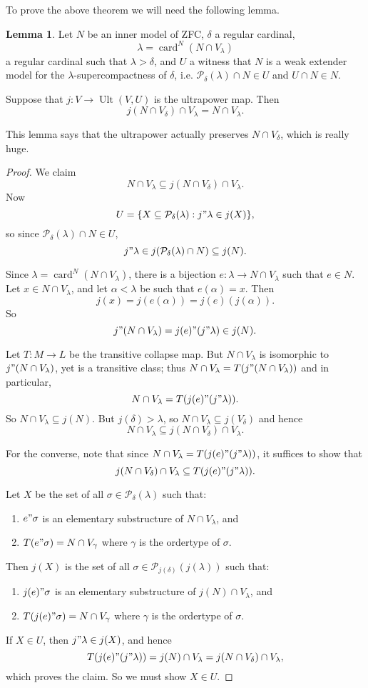 \documentclass[12pt]{report}
\newcommand{\card}{\operatorname{card}}
\newcommand{\pset}{\mathcal{P}}
\DeclareMathOperator{\Ult}{Ult}
\theoremstyle{definition}
\newtheorem{lemma}[theorem]{Lemma}
\begin{document}
To prove the above theorem we will need the following lemma.
\begin{lemma}
Let $N$ be an inner model of ZFC, $\delta$ a regular cardinal,
$$\lambda = \card^N(N \cap V_\lambda)$$
a regular cardinal such that $\lambda > \delta$, and $U$ a witness that $N$ is a weak extender model for the $\lambda$-supercompactness of $\delta$, i.e. $\pset_\delta(\lambda) \cap N \in U$ and $U \cap N \in N$.

Suppose that $j: V \to \Ult(V, U)$ is the ultrapower map. Then
$$j(N \cap V_\delta) \cap V_\lambda = N \cap V_\lambda.$$
\end{lemma}
This lemma says that the ultrapower actually preserves $N \cap V_\delta$, which is really huge.
\begin{proof}
We claim
$$N \cap V_\lambda \subseteq j(N \cap V_\delta) \cap V_\lambda.$$
Now
$$U = \{X \subseteq \pset_\delta(\lambda): j"\lambda \in j(X)\},$$
so since $\pset_\delta(\lambda) \cap N \in U$,
$$j"\lambda \in j(\pset_\delta(\lambda) \cap N) \subseteq j(N).$$

Since $\lambda = \card^N(N \cap V_\lambda)$, there is a bijection $e: \lambda \to N \cap V_\lambda$ such that $e \in N$.
Let $x \in N \cap V_\lambda$, and let $\alpha < \lambda$ be such that $e(\alpha) = x$. Then
$$j(x) = j(e(\alpha)) = j(e)(j(\alpha)).$$
So
$$j"(N \cap V_\lambda) = j(e)"(j"\lambda) \in j(N).$$

Let $T: M \to L$ be the transitive collapse map.
But $N \cap V_\lambda$ is isomorphic to $j"(N \cap V_\lambda)$, yet is a transitive class; thus $N \cap V_\lambda = T(j"(N \cap V_\lambda))$ and in particular,
$$N \cap V_\lambda = T(j(e)"(j"\lambda)).$$
So $N \cap V_\lambda \subseteq j(N)$.
But $j(\delta) > \lambda$, so $N \cap V_\lambda \subseteq j(V_\delta)$ and hence
$$N \cap V_\lambda \subseteq j(N \cap V_\delta) \cap V_\lambda.$$

For the converse, note that since $N \cap V_\lambda = T(j(e)"(j"\lambda))$, it suffices to show that
$$j(N \cap V_\delta) \cap V_\lambda \subseteq T(j(e)"(j"\lambda)).$$

Let $X$ be the set of all $\sigma \in \pset_\delta(\lambda)$ such that:
\begin{enumerate}
\item $e"\sigma$ is an elementary substructure of $N \cap V_\lambda$, and
\item $T(e"\sigma) = N \cap V_\gamma$ where $\gamma$ is the ordertype of $\sigma$.
\end{enumerate}
Then $j(X)$ is the set of all $\sigma \in \pset_{j(\delta)}(j(\lambda))$ such that:
\begin{enumerate}
\item $j(e)"\sigma$ is an elementary substructure of $j(N) \cap V_\lambda$, and
\item $T(j(e)"\sigma) = N \cap V_\gamma$ where $\gamma$ is the ordertype of $\sigma$.
\end{enumerate}
If $X \in U$, then $j"\lambda \in j(X)$, and hence
$$T(j(e)"(j"\lambda)) = j(N) \cap V_\lambda = j(N \cap V_\delta) \cap V_\lambda,$$
which proves the claim. So we must show $X \in U$.


\end{proof}
\end{document}
